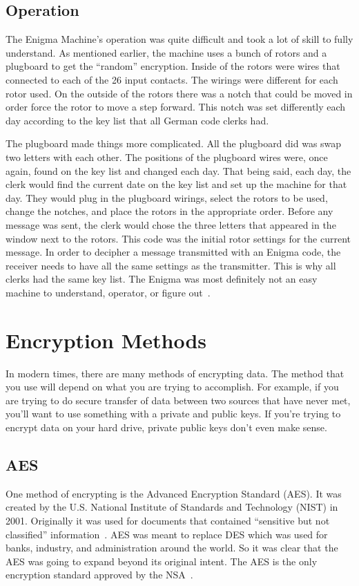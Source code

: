 \documentclass[12pt,a4paper,titlepage]{article}
\begin{document}
\subsection{Operation}
The Enigma Machine's operation was quite difficult and took a lot of skill to
fully understand. As mentioned earlier, the machine uses a bunch of rotors and a
plugboard to get the ``random'' encryption. Inside of the rotors were wires that
connected to each of the 26 input contacts. The wirings were different for each
rotor used. On the outside of the rotors there was a notch that could be moved
in order force the rotor to move a step forward. This notch was set differently
each day according to the key list that all German code clerks had.

The plugboard made things more complicated. All the plugboard did was swap two
letters with each other. The positions of the plugboard wires were, once again,
found on the key list and changed each day. That being said, each day, the
clerk would find the current date on the key list and set up the machine for
that day. They would plug in the plugboard wirings, select the rotors to be
used, change the notches, and place the rotors in the appropriate order. Before
any message was sent, the clerk would chose the three letters that appeared
in the window next to the rotors. This code was the initial rotor settings for
the current message. In order to decipher a message transmitted with an Enigma
code, the receiver needs to have all the same settings as the transmitter. This
is why all clerks had the same key list. The Enigma was most definitely not an
easy machine to understand, operator, or figure out~\cite{wilcox2006solving}.

\section{Encryption Methods}
In modern times, there are many methods of encrypting data. The method that you
use will depend on what you are trying to accomplish. For example, if you are 
trying to do secure transfer of data between two sources that have never met, 
you'll want to use something with a private and public keys. If you're trying 
to encrypt data on your hard drive, private public keys don't even make sense. 

\subsection{AES}
One method of encrypting is the Advanced Encryption Standard (AES)\@. It was 
created by the U.S. National Institute of Standards and Technology (NIST) in 
2001. Originally it was used for documents that contained ``sensitive but not 
classified'' information~\cite{daemen2013design}. AES was meant to replace DES 
which was used for banks, industry, and administration around the world. So it 
was clear that the AES was going to expand beyond its original intent. The AES 
is the only encryption standard approved by the NSA~\cite{daemen2013design}.
\end{document}

